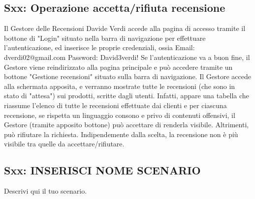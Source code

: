 \documentclass[12pt, a4paper, oneside]{book}
\begin{document}
    \subsection*{Sxx: Operazione accetta/rifiuta recensione}
    Il Gestore delle Recensioni Davide Verdi accede alla pagina di accesso tramite il bottone di "Login" situato nella barra di navigazione per effettuare l'autenticazione, ed inserisce le proprie credenziali, ossia Email: dverdi02@gmail.com Password: David3verdi!
    Se l'autenticazione va a buon fine, il Gestore viene reindirizzato alla pagina principale e può accedere tramite un bottone "Gestione recensioni" situato sulla barra di navigazione.
    Il Gestore accede alla schermata apposita, e verranno mostrate tutte le recensioni (che sono in stato di "attesa") sui prodotti, scritte dagli utenti. Infatti, appare una tabella che riassume l'elenco di tutte le recensioni effettuate dai clienti e per ciascuna recensione, se rispetta un linguaggio consono e privo di contenuti offensivi, il Gestore (tramite apposito bottone) può accettare di renderla visibile. Altrimenti, può rifiutare la richiesta.
    Indipendemente dalla scelta, la recensione non è più visibile tra quelle da accettare/rifiutare.

    \subsection*{Sxx: INSERISCI NOME SCENARIO}
        Descrivi qui il tuo scenario.
\end{document}
